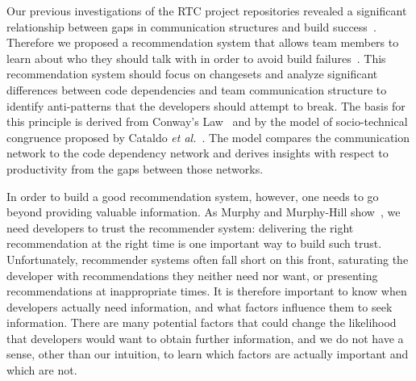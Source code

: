 \documentclass[12pt,oneside]{book}
\begin{document}
Our previous investigations of the RTC project repositories revealed a significant relationship between gaps in communication structures and build success~\cite{wolf:icse:2009}. Therefore we proposed a recommendation system that allows team members to learn about who they should talk with in order to avoid build failures~\cite{schroeter:rsse:2008}. This recommendation system should focus on changesets and analyze significant differences between code dependencies and team communication structure to identify anti-patterns that the developers should attempt to break.
The basis for this principle is derived from Conway's Law~\cite{conway:datamination:1968} and by the model of socio-technical congruence proposed by Cataldo \emph{et al.}~\cite{cataldo:cscw:2006,cataldo:esem:2008}.
The model compares the communication network to the code dependency network and derives insights with respect to productivity from the gaps between those networks.
\vspace{-2pt}

In order to build a good recommendation system, however, one needs to go beyond providing valuable information. As Murphy and Murphy-Hill show~\cite{murphy:rsse:2010}, we need developers to trust the recommender system: delivering the right recommendation at the right time is one important way to build such trust. Unfortunately, recommender systems often fall short on this front, saturating the developer with recommendations they neither need nor want, or presenting recommendations at inappropriate times. It is therefore important to know when developers actually need information, and what factors influence them to seek information. There are many potential factors that could change the likelihood that developers would want to obtain further information, and we do not have a sense, other than our intuition, to learn which factors are actually important and which are not.
\vspace{-2pt}
\end{document}
